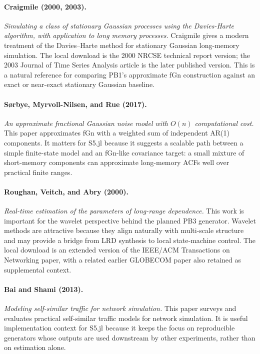 \documentclass[11pt]{article}
\begin{document}
\paragraph{Craigmile (2000, 2003).}
\emph{Simulating a class of stationary Gaussian processes using the Davies-Harte
algorithm, with application to long memory processes.}
Craigmile gives a modern treatment of the Davies--Harte method for stationary
Gaussian long-memory simulation. The local download is the 2000 NRCSE technical
report version; the 2003 Journal of Time Series Analysis article is the later
published version. This is a natural reference for comparing PB1's approximate
fGn construction against an exact or near-exact stationary Gaussian baseline.

\paragraph{Sørbye, Myrvoll-Nilsen, and Rue (2017).}
\emph{An approximate fractional Gaussian noise model with $O(n)$ computational
cost.}
This paper approximates fGn with a weighted sum of independent AR(1) components.
It matters for S5.jl because it suggests a scalable path between a simple
finite-state model and an fGn-like covariance target: a small mixture of
short-memory components can approximate long-memory ACFs well over practical
finite ranges.

\paragraph{Roughan, Veitch, and Abry (2000).}
\emph{Real-time estimation of the parameters of long-range dependence.}
This work is important for the wavelet perspective behind the planned PB3
generator. Wavelet methods are attractive because they align naturally with
multi-scale structure and may provide a bridge from LRD synthesis to local
state-machine control. The local download is an extended version of the
IEEE/ACM Transactions on Networking paper, with a related earlier GLOBECOM paper
also retained as supplemental context.

\paragraph{Bai and Shami (2013).}
\emph{Modeling self-similar traffic for network simulation.}
This paper surveys and evaluates practical self-similar traffic models for
network simulation. It is useful implementation context for S5.jl because it
keeps the focus on reproducible generators whose outputs are used downstream by
other experiments, rather than on estimation alone.
\end{document}
